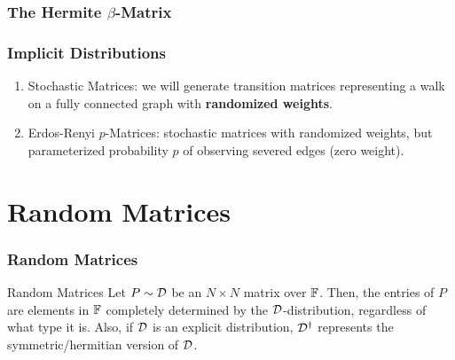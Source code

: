 \begin{frame} \frametitle{The Hermite $\beta$-Matrix}


\end{frame}
\begin{frame} \frametitle{Implicit Distributions}

\begin{enumerate}
  \item Stochastic Matrices: we will generate transition matrices representing a walk on a fully connected graph with \textbf{randomized weights}.
  \item Erdos-Renyi $p$-Matrices: stochastic matrices with randomized weights, but parameterized probability $p$ of observing severed edges (zero weight).
\end{enumerate}

\end{frame}


\section{Random Matrices}
\begin{frame} \frametitle{Random Matrices}

\begin{alertblock}{Random Matrices}
Let $P \sim \mathcal{D}$ be an $N \times N$ matrix over $\mathbb{F}$. Then, the entries of $P$ are elements in $\mathbb{F}$ completely determined by the $\mathcal{D}$-distribution, regardless of what type it is.
Also, if $\mathcal{D}$ is an explicit distribution, $\mathcal{D}^\dagger$ represents the symmetric/hermitian version of $\mathcal{D}$.
\end{alertblock}
\end{frame}

